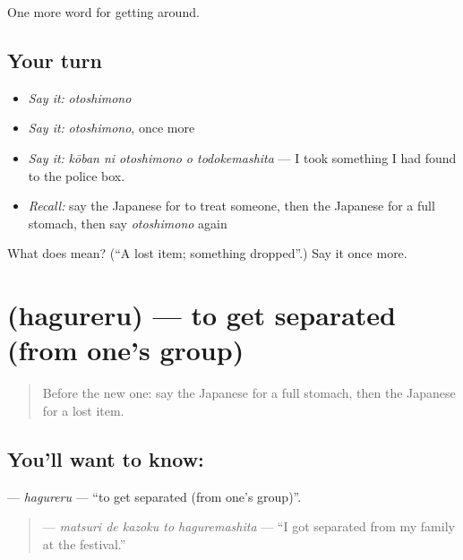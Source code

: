 \begin{grammarlens}[title={What you've built}]
One more word for getting around.
\end{grammarlens}

\subsection*{Your turn}
\begin{itemize}
\raggedright
  \item \emph{Say it:} \emph{otoshimono}
  \item \emph{Say it:} \emph{otoshimono}, once more
  \item \emph{Say it:} \emph{kōban ni otoshimono o todokemashita} — I took something I had found to the police box.
  \item \emph{Recall:} say the Japanese for to treat someone, then the Japanese for a full stomach, then say \emph{otoshimono} again
\end{itemize}

\begin{tcolorbox}[breakable,colback=teal!4,colframe=teal!35!black,title={Before you move on}]
What does  mean? (\textquotedblleft{}A lost item; something dropped\textquotedblright{}.) Say it once more.
\end{tcolorbox}
\section[\texorpdfstring{\ja{はぐれる} (hagureru)}{はぐれる (hagureru)}]{ (hagureru) — to get separated (from one's group)}

\label{lesson:JA-C424-hagureru}



\begin{quote}
Before the new one: say the Japanese for a full stomach, then the Japanese for a lost item.
\end{quote}

\subsection*{You'll want to know: }
\textbf{} — \emph{hagureru} — \textquotedblleft{}to get separated (from one's group)\textquotedblright{}.

\begin{quote}
\textbf{  } — \emph{matsuri de kazoku to haguremashita} — \textquotedblleft{}I got separated from my family at the festival.\textquotedblright{}
\end{quote}

